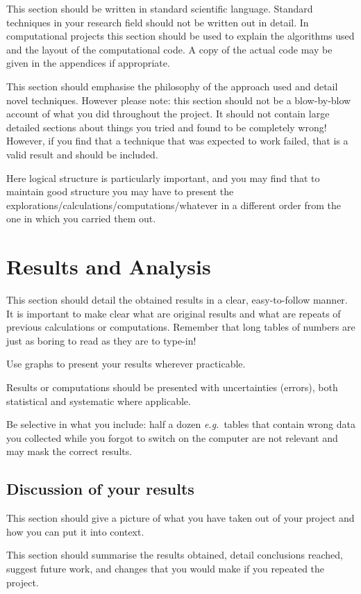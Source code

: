 \documentclass[12pt,a4paper]{report}
\begin{document}
This section should be written in standard scientific
language. Standard techniques in your research field should not be
written out in detail. In computational projects this section should
be used to explain the algorithms used and the layout of the
computational code. A copy of the actual code may be given in the
appendices if appropriate.

This section should emphasise the philosophy of the approach used and
detail novel techniques. However please note: this section should not
be a blow-by-blow account of what you did throughout the project. It
should not contain large detailed sections about things you tried and
found to be completely wrong! However, if you find that a technique
that was expected to work failed, that is a valid result and should be
included.

Here logical structure is particularly important, and you may find
that to maintain good structure you may have to present the
explorations/calculations/computations/whatever in a different order
from the one in which you carried them out.


\chapter{Results and Analysis}

This section should detail the obtained results in a clear,
easy-to-follow manner. It is important to make clear what are original
results and what are repeats of previous calculations or computations.
Remember that long tables of numbers are just as boring to read as
they are to type-in!

Use graphs to present your results wherever practicable.

Results or computations should be presented with uncertainties
(errors), both statistical and systematic where applicable.

Be selective in what you include: half a dozen \emph{e.g.}~tables that
contain wrong data you collected while you forgot to switch on the
computer are not relevant and may mask the correct results.

\section{Discussion of your results}

This section should give a picture of what you have taken out of your
project and how you can put it into context.

This section should summarise the results obtained, detail conclusions
reached, suggest future work, and changes that you would make if you
repeated the project.
\end{document}
